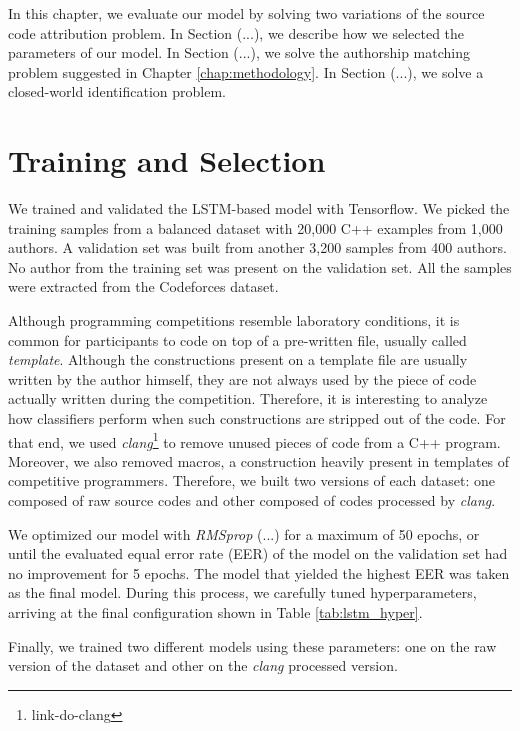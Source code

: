 \label{chap:evaluation}

In this chapter, we evaluate our model by solving two variations of the source code attribution problem. In Section (...), we describe how we selected the parameters of our model. In Section (...), we solve the authorship matching problem suggested in Chapter \ref{chap:methodology}. In Section (...), we solve a closed-world identification problem.

\section{Training and Selection}\label{sec:validation}

We trained and validated the LSTM-based model with Tensorflow. We picked the training samples from a balanced dataset with 20,000 C++ examples from 1,000 authors. A validation set was built from another 3,200 samples from 400 authors. No author from the training set was present on the validation set. All the samples were extracted from the Codeforces dataset.

Although programming competitions resemble laboratory conditions, it is common for participants to code on top of a pre-written file, usually called \textit{template}. Although the constructions present on a template file are usually written by the author himself, they are not always used by the piece of code actually written during the competition. Therefore, it is interesting to analyze how classifiers perform when such constructions are stripped out of the code. For that end, we used \textit{clang}\footnote{link-do-clang} to remove unused pieces of code from a C++ program. Moreover, we also removed macros, a construction heavily present in templates of competitive programmers. Therefore, we built two versions of each dataset: one composed of raw source codes and other composed of codes processed by \textit{clang}.

We optimized our model with \textit{RMSprop} (...) for a maximum of 50 epochs, or until the evaluated equal error rate (EER) of the model on the validation set had no improvement for 5 epochs. The model that yielded the highest EER was taken as the final model. During this process, we carefully tuned hyperparameters, arriving at the final configuration shown in Table \ref{tab:lstm_hyper}.

Finally, we trained two different models using these parameters: one on the raw version of the dataset and other on the \textit{clang} processed version.

